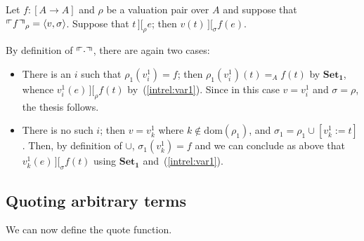 \documentclass[numreferences]{kluwer}
\newcommand{\intII}{\,]\![}
\newcommand{\intrel}{\mathbin{\intII_{\rho}}}
\newcommand{\axiom}[1]{\ensuremath{\mathbf{#1}}}
\newcommand{\mlfnv}[2]{\ensuremath\ulcorner\!\!\ulcorner{#1}\urcorner\!\!\urcorner_{#2}}
\newcommand{\domain}{\ensuremath{\mathrm{dom}}}
\newcommand{\intrels}{\mathbin{\intII_{\sigma}}}
\begin{document}
\begin{article}
\begin{lemma}\label{quotev1corr}
Let $f:[A\to A]$ and $\rho$ be a valuation pair over $A$ and suppose
that $\mlfnv{f}{\rho}=\langle v,\sigma\rangle$.  Suppose that $t\intrel e$;
then $v(t)\intrels f(e)$.
\end{lemma}
\begin{pf}
By definition of $\mlfnv{\cdot}{}$, there are again two cases:
\begin{itemize}
\item There is an $i$ such that $\rho_1(v^1_i)=f$; then
$\rho_1(v^1_i)(t)=_A f(t)$ by \axiom{Set_1}, whence $v^1_i(e)\intrel
f(t)$ by~(\ref{intrel:var1}).  Since in this case $v=v^1_i$ and
$\sigma=\rho$, the thesis follows.
\item There is no such $i$; then $v=v^1_k$ where $k\not\in\domain(\rho_1)$,
and $\sigma_1=\rho_1\cup[v^1_k:=t]$.  Then, by definition of $\cup$,
$\sigma_1(v^1_k)=f$ and we can conclude as above that
$v^1_k(e)\intrels f(t)$ using \axiom{Set_1} and~(\ref{intrel:var1}).
\end{itemize}
\end{pf}

\subsection{Quoting arbitrary terms}

We can now define the quote function.


\end{article}
\end{document}
